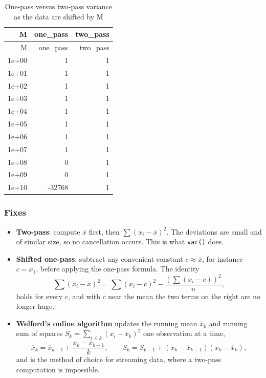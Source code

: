 \documentclass[
  letterpaper,
  DIV=11,
  numbers=noendperiod]{scrreprt}
\begin{document}
\begin{longtable}[]{@{}rrr@{}}
\caption{One-pass versus two-pass variance as the data are shifted by
M}\tabularnewline
\toprule\noalign{}
M & one\_pass & two\_pass \\
\midrule\noalign{}
\endfirsthead
\toprule\noalign{}
M & one\_pass & two\_pass \\
\midrule\noalign{}
\endhead
\bottomrule\noalign{}
\endlastfoot
1e+00 & 1 & 1 \\
1e+01 & 1 & 1 \\
1e+02 & 1 & 1 \\
1e+03 & 1 & 1 \\
1e+04 & 1 & 1 \\
1e+05 & 1 & 1 \\
1e+06 & 1 & 1 \\
1e+07 & 1 & 1 \\
1e+08 & 0 & 1 \\
1e+09 & 0 & 1 \\
1e+10 & -32768 & 1 \\
\end{longtable}

\subsubsection*{Fixes}\label{fixes}

\begin{itemize}
\item
  \textbf{Two-pass}: compute \(\overline x\) first, then
  \(\sum (x_i - \overline x)^2\). The deviations are small and of
  similar size, so no cancellation occurs. This is what \texttt{var()}
  does.
\item
  \textbf{Shifted one-pass}: subtract any convenient constant
  \(c \approx \overline x\), for instance \(c = x_1\), before applying
  the one-pass formula. The identity \[
  \sum (x_i-\overline x)^2 = \sum (x_i - c)^2 - \frac{\left(\sum (x_i - c)\right)^2}{n},
  \] holds for every \(c\), and with \(c\) near the mean the two terms
  on the right are no longer huge.
\item
  \textbf{Welford's online algorithm} updates the running mean
  \(\overline x_k\) and running sum of squares
  \(S_k = \sum_{i\le k}(x_i - \overline x_k)^2\) one observation at a
  time, \[
  \overline x_k = \overline x_{k-1} + \frac{x_k - \overline x_{k-1}}{k}, \qquad S_k = S_{k-1} + (x_k - \overline x_{k-1})(x_k - \overline x_k),
  \] and is the method of choice for streaming data, where a two-pass
  computation is impossible.
\end{itemize}
\end{document}
